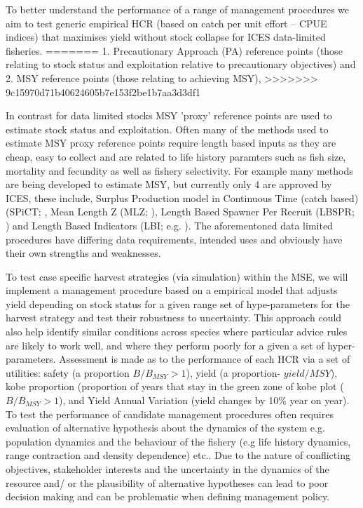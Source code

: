 \documentclass[preprint,12pt]{elsarticle}
\begin{document}
To better understand the performance of a range of management procedures we aim to test generic empirical HCR (based on catch per unit effort – CPUE indices) that maximises yield without stock collapse for ICES data-limited fisheries. 
=======
1. Precautionary Approach (PA) reference points (those relating to stock status and exploitation relative to precautionary objectives) and 
2. MSY reference points (those relating to achieving MSY), 
>>>>>>> 9c15970d71b40624605b7e153f2be1b7aa3d3df1

In contrast for data limited stocks MSY 'proxy' reference points are used to estimate stock status and exploitation.  Often many of the methods used to estimate MSY proxy reference points require length based inputs as they are cheap, easy to collect \cite{Quinn and Deriso, 1999} and are related to life history paramters such as fish size, mortality and fecundity as well as fishery selectivity. For example many methods are being developed to estimate MSY, but currently only 4 are approved by ICES, these include, Surplus Production model in Continuous Time (catch based) (SPiCT; \cite{Pedersen and Berg, 2016}, Mean Length Z (MLZ; \cite{Gedamke & Hoenig, 2016}), Length Based Spawner Per Recruit (LBSPR; \cite{Hordyk et al 2015}) and Length Based Indicators (LBI; e.g. \cite{Probst et al 2013}). The aforementoned data limited procedures have differing data requirements, intended uses and obviously have their own strengths and weaknesses. 

To test case specific harvest strategies (via simulation) within the MSE, we will implement a management procedure based on a empirical model that adjusts yield depending on stock status for a given range set of hype-parameters for the harvest strategy and test their robustness to uncertainty.  This approach could also help identify similar conditions across species where particular advice rules are likely to work well, and where they perform poorly for a given a set of hyper-parameters. Assessment is made as to the performance of each HCR via a set of utilities: safety (a proportion $B/B_{MSY} >1$), yield (a proportion- $yield/MSY$), kobe proportion (proportion of years that stay in the green zone of kobe plot ($B/B_{MSY} >1$), and Yield Annual Variation (yield changes by 10\% year on year).  
To test the performance of candidate management procedures often requires evaluation of alternative hypothesis about the dynamics of the system e.g. population dynamics and the behaviour of the fishery (e.g life history dynamics, range contraction and density dependence) etc.. Due to the nature of conflicting objectives, stakeholder interests and the uncertainty in the dynamics of the resource and/ or the plausibility of alternative hypotheses can lead to poor decision making and can be problematic when defining management policy.
\end{document}
